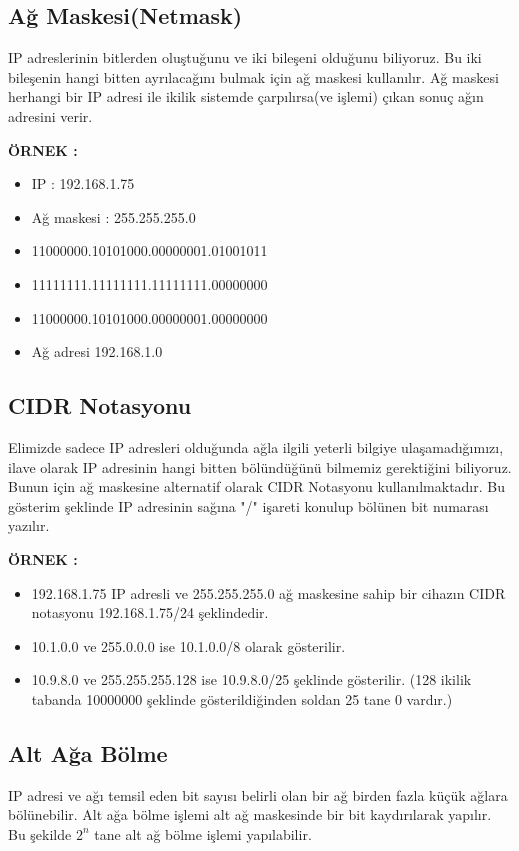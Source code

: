 \subsection{Ağ Maskesi(Netmask)}

IP adreslerinin bitlerden oluştuğunu ve iki bileşeni olduğunu biliyoruz. Bu iki bileşenin hangi bitten ayrılacağını bulmak için ağ maskesi kullanılır. Ağ maskesi herhangi bir IP adresi ile ikilik sistemde çarpılırsa(ve işlemi) çıkan sonuç ağın adresini verir. 


\textbf{ÖRNEK : }

\begin{itemize}
\item[] IP : 192.168.1.75
\item[] Ağ maskesi : 255.255.255.0
\item[] 11000000.10101000.00000001.01001011
\item[] 11111111.11111111.11111111.00000000
\item[] 11000000.10101000.00000001.00000000
\item[] Ağ adresi 192.168.1.0
\end{itemize} 

\subsection{CIDR Notasyonu}

Elimizde sadece IP adresleri olduğunda ağla ilgili yeterli bilgiye ulaşamadığımızı, ilave olarak IP adresinin hangi bitten bölündüğünü bilmemiz gerektiğini biliyoruz. Bunun için ağ maskesine alternatif olarak CIDR Notasyonu kullanılmaktadır. Bu gösterim şeklinde IP adresinin sağına "/" işareti konulup bölünen bit numarası yazılır. 

\textbf{ÖRNEK : } 

\begin{itemize}
\item[] 192.168.1.75 IP adresli ve 255.255.255.0 ağ maskesine sahip bir cihazın CIDR notasyonu 192.168.1.75/24 şeklindedir. 
\item[] 10.1.0.0 ve 255.0.0.0 ise 10.1.0.0/8 olarak gösterilir. 
\item[] 10.9.8.0 ve 255.255.255.128 ise 10.9.8.0/25 şeklinde gösterilir. (128 ikilik tabanda 10000000 şeklinde gösterildiğinden soldan 25 tane 0 vardır.) 
\end{itemize}

\subsection{Alt Ağa Bölme}
IP adresi ve ağı temsil eden bit sayısı belirli olan bir ağ birden fazla küçük ağlara bölünebilir. Alt ağa bölme işlemi alt ağ maskesinde bir bit kaydırılarak yapılır. Bu şekilde $2^n$ tane alt ağ bölme işlemi yapılabilir. 


